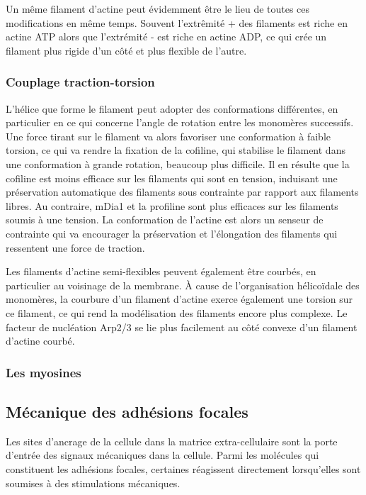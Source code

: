 \documentclass{report}
\begin{document}
Un même filament d'actine peut évidemment être le lieu de toutes ces modifications en même temps. Souvent l'extrêmité + des filaments est riche en actine ATP alors que l'extrémité - est riche en actine ADP, ce qui crée un filament plus rigide d'un côté et plus flexible de l'autre. 

\subsubsection{Couplage traction-torsion}

L'hélice que forme le filament peut adopter des conformations différentes, en particulier en ce qui concerne l'angle de rotation entre les monomères successifs. 
Une force tirant sur le filament va alors favoriser une conformation à faible torsion, ce qui va rendre la fixation de la cofiline, qui stabilise le filament dans une conformation à grande rotation, beaucoup plus difficile. 
Il en résulte que la cofiline est moins efficace sur les filaments qui sont en tension, induisant une préservation automatique des filaments sous contrainte par rapport aux filaments libres. 
Au contraire, mDia1 et la profiline sont plus efficaces sur les filaments soumis à une tension. 
La conformation de l'actine est alors un senseur de contrainte qui va encourager la préservation et l'élongation des filaments qui ressentent une force de traction. 

Les filaments d'actine semi-flexibles peuvent également être courbés, en particulier au voisinage de la membrane. 
À cause de l'organisation hélicoïdale des monomères, la courbure d'un filament d'actine exerce également une torsion sur ce filament, ce qui rend la modélisation des filaments encore plus complexe. 
Le facteur de nucléation Arp2/3 se lie plus facilement au côté convexe d'un filament d'actine courbé. 

\subsubsection{Les myosines}

\subsection{Mécanique des adhésions focales}

Les sites d'ancrage de la cellule dans la matrice extra-cellulaire sont la porte d'entrée des signaux mécaniques dans la cellule. Parmi les molécules qui constituent les adhésions focales, certaines réagissent directement lorsqu'elles sont soumises à des stimulations mécaniques. 
\end{document}
